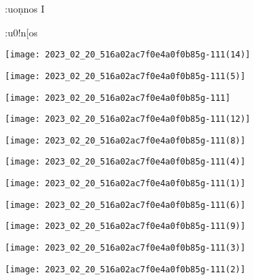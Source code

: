 \documentclass[10pt]{article}
\begin{document}
\begin{enumerate}
\begin{enumerate}
\begin{enumerate}
\end{enumerate}

:uoṇnos $\mathrm{I}$

:u0!n[os

\begin{center}
\texttt{[image: 2023\_02\_20\_516a02ac7f0e4a0f0b85g-111(14)]}
\end{center}

\begin{center}
\texttt{[image: 2023\_02\_20\_516a02ac7f0e4a0f0b85g-111(5)]}
\end{center}

\begin{center}
\texttt{[image: 2023\_02\_20\_516a02ac7f0e4a0f0b85g-111]}
\end{center}

\begin{center}
\texttt{[image: 2023\_02\_20\_516a02ac7f0e4a0f0b85g-111(12)]}
\end{center}

\begin{center}
\texttt{[image: 2023\_02\_20\_516a02ac7f0e4a0f0b85g-111(8)]}
\end{center}

\begin{center}
\texttt{[image: 2023\_02\_20\_516a02ac7f0e4a0f0b85g-111(4)]}
\end{center}

\begin{center}
\texttt{[image: 2023\_02\_20\_516a02ac7f0e4a0f0b85g-111(1)]}
\end{center}

\begin{center}
\texttt{[image: 2023\_02\_20\_516a02ac7f0e4a0f0b85g-111(6)]}
\end{center}

\begin{center}
\texttt{[image: 2023\_02\_20\_516a02ac7f0e4a0f0b85g-111(9)]}
\end{center}

\begin{center}
\texttt{[image: 2023\_02\_20\_516a02ac7f0e4a0f0b85g-111(3)]}
\end{center}

\begin{center}
\texttt{[image: 2023\_02\_20\_516a02ac7f0e4a0f0b85g-111(2)]}
\end{center}


\end{enumerate}
\end{enumerate}
\end{document}
